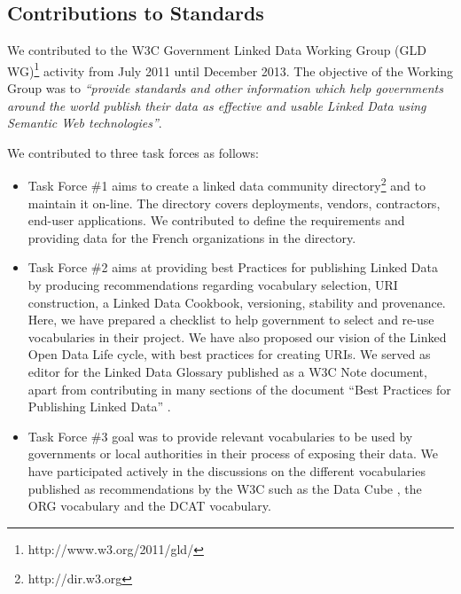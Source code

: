 \documentclass[a4paper,11pt,twoside]{report}
\begin{document}
\subsection{Contributions to Standards}
\label{sec:contrib-standard}
We contributed to the W3C Government Linked Data Working Group (GLD WG)\footnote{http://www.w3.org/2011/gld/} activity from July 2011 until December 2013.  The objective of the Working Group was to \textit{``provide standards and other information which help governments around the world publish their data as effective and usable Linked Data using Semantic Web technologies''}.

We contributed to three task forces as follows:
\begin{itemize}
\item Task Force \#1 aims to create a linked data community directory\footnote{http://dir.w3.org} and to maintain it on-line. The directory covers deployments, vendors, contractors, end-user applications. We contributed to define the requirements and providing data for the French organizations in the directory.

\item Task Force \#2 aims at providing best Practices for publishing Linked Data by producing recommendations regarding vocabulary selection, URI construction, a Linked Data Cookbook, versioning, stability and provenance. Here, we have prepared a checklist to help government to select and re-use vocabularies in their project. We have also proposed our vision of the Linked Open Data Life cycle, with best practices for creating URIs. We served as editor for the Linked Data Glossary \cite{glossairegld} published as a W3C Note document, apart from contributing in many sections of the document ``Best Practices for Publishing Linked Data'' \cite{bpgld}.

\item Task Force \#3 goal was to provide relevant vocabularies to be used by governments or local authorities in their process of exposing their data. We have participated actively in the discussions on the different vocabularies published as recommendations by the W3C such as the Data Cube \cite{dcube}, the ORG vocabulary \cite{org} and the DCAT \cite{dcat} vocabulary.
\end{itemize}
\end{document}
